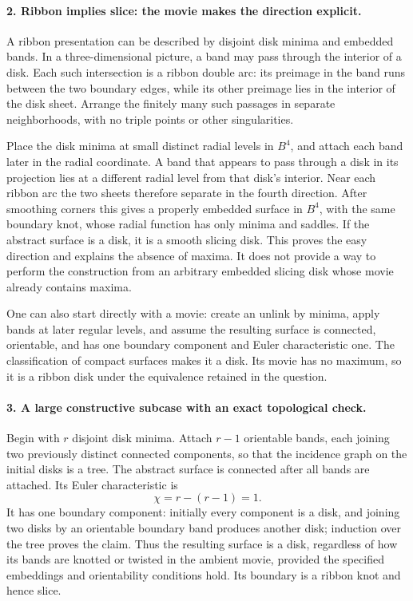 \documentclass[11pt]{article}
\begin{document}
\paragraph{2. Ribbon implies slice: the movie makes the direction explicit.}
A ribbon presentation can be described by disjoint disk minima and embedded bands. In a three-dimensional picture, a band may pass through the interior of a disk. Each such intersection is a ribbon double arc: its preimage in the band runs between the two boundary edges, while its other preimage lies in the interior of the disk sheet. Arrange the finitely many such passages in separate neighborhoods, with no triple points or other singularities.

Place the disk minima at small distinct radial levels in $B^4$, and attach each band later in the radial coordinate. A band that appears to pass through a disk in its projection lies at a different radial level from that disk's interior. Near each ribbon arc the two sheets therefore separate in the fourth direction. After smoothing corners this gives a properly embedded surface in $B^4$, with the same boundary knot, whose radial function has only minima and saddles. If the abstract surface is a disk, it is a smooth slicing disk. This proves the easy direction and explains the absence of maxima. It does not provide a way to perform the construction from an arbitrary embedded slicing disk whose movie already contains maxima.

One can also start directly with a movie: create an unlink by minima, apply bands at later regular levels, and assume the resulting surface is connected, orientable, and has one boundary component and Euler characteristic one. The classification of compact surfaces makes it a disk. Its movie has no maximum, so it is a ribbon disk under the equivalence retained in the question.

\paragraph{3. A large constructive subcase with an exact topological check.}
Begin with $r$ disjoint disk minima. Attach $r-1$ orientable bands, each joining two previously distinct connected components, so that the incidence graph on the initial disks is a tree. The abstract surface is connected after all bands are attached. Its Euler characteristic is
\[
 \chi=r-(r-1)=1.
\]
It has one boundary component: initially every component is a disk, and joining two disks by an orientable boundary band produces another disk; induction over the tree proves the claim. Thus the resulting surface is a disk, regardless of how its bands are knotted or twisted in the ambient movie, provided the specified embeddings and orientability conditions hold. Its boundary is a ribbon knot and hence slice.
\end{document}
